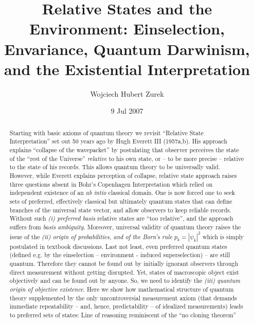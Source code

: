 \documentclass[aps,rmp,floatfix,11pt]{revtex4}
\newcommand{\+}         {\dagger}
\begin{document}
\title{Relative States and the Environment: Einselection, Envariance, Quantum Darwinism, and the Existential Interpretation}

\author{Wojciech Hubert Zurek}

\address{Theory Division, MS B213, LANL
    Los Alamos, NM, 87545, U.S.A.}

\date{9 Jul 2007}

\begin{abstract}
Starting with basic axioms of quantum theory we revisit  ``Relative State Interpretation'' set out 50 years ago by Hugh Everett III (1957a,b). His approach explains ``collapse of the wavepacket'' by postulating 
that observer perceives the state of the ``rest of the Universe'' {\it relative} to his own state, 
or -- to be more precise -- relative to the state of his records. This allows quantum theory to be universally valid. However, while Everett explains perception of collapse, relative state approach raises 
three questions absent in Bohr's Copenhagen Interpretation which relied on independent existence 
of an {\it ab intio} classical domain. One is now forced one to seek sets of preferred, effectively classical but ultimately quantum states that can define branches of the universal state vector, and allow observers to keep reliable records. Without such {\it (i) preferred basis} relative states are ``too relative'', and the approach suffers from {\it basis ambiguity}. Moreover, universal validity of quantum theory 
raises the issue of the {\it (ii) origin of probabilities, and of the Born's rule} $p_k = |\psi_k|^2$ which is simply postulated in textbook discussions. Last not least, even preferred quantum states (defined e.g. by the einselection -- environment - induced superselection) -- are still quantum. Therefore they cannot be found out by initially ignorant observers through direct measurement without getting disrupted. 
Yet, states of macroscopic object exist objectively and can be found out by anyone. So, we need to identify the {\it (iii) quantum origin of objective existence}. Here we show how mathematical structure of quantum theory supplemented by the only uncontroversial measurement axiom (that demands immediate repeatability -- and, hence, predictability -- of idealized measurements) 
leads to preferred sets of states: Line of reasoning reminiscent of the  ``no cloning theorem'' 

\end{abstract}
\end{document}
